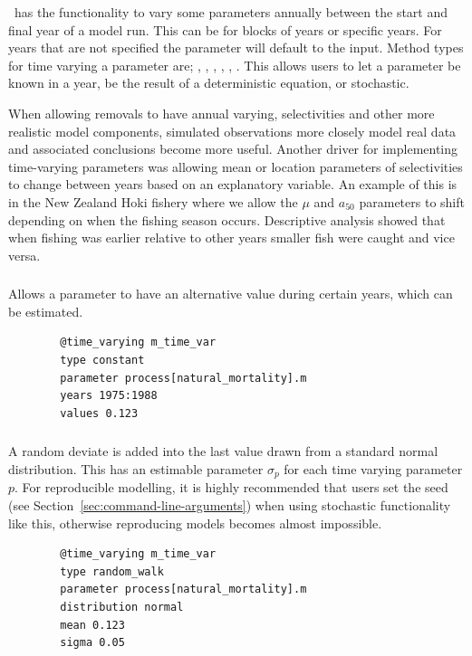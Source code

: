 \IBM\ has the functionality to vary some parameters annually between the start and final year of a model run. This can be for blocks of years or specific years. For years that are not specified the parameter will default to the input. Method types for time varying a parameter are; , , , , , . This allows users to let a parameter be known in a year, be the result of a deterministic equation, or stochastic. 

When allowing removals to have annual varying, selectivities and other more realistic model components, simulated observations more closely model real data and associated conclusions become more useful. Another driver for implementing time-varying parameters was allowing mean or location parameters of selectivities to change between years based on an explanatory variable. An example of this is in the New Zealand Hoki fishery where we allow the $\mu$ and $a_{50}$ parameters to shift depending on when the fishing season occurs. Descriptive analysis showed that when fishing was earlier relative to other years smaller fish were caught and vice versa.

\subsubsection[Constant]{}
Allows a parameter to have an alternative value during certain years, which can be estimated.
{\small{\begin{verbatim}
		@time_varying m_time_var
		type constant
		parameter process[natural_mortality].m
		years 1975:1988
		values 0.123
		\end{verbatim}}}


\subsubsection[Random Walk]{}

A random deviate is added into the last value drawn from a standard normal distribution. This has an estimable parameter $\sigma_p$ for each time varying parameter $p$. For reproducible modelling, it is highly recommended that users set the seed (see Section~\ref{sec:command-line-arguments}) when using stochastic functionality like this, otherwise reproducing models becomes almost impossible.
{\small{\begin{verbatim}
		@time_varying m_time_var
		type random_walk
		parameter process[natural_mortality].m
		distribution normal
		mean 0.123
		sigma 0.05
		\end{verbatim}}}

